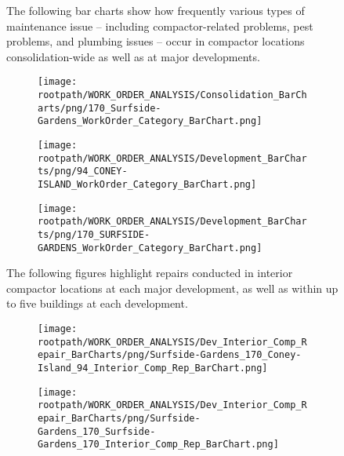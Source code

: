 \begin{figure}[h]
                                \sf
                                The following bar charts show how frequently various types of maintenance issue -- including compactor-related problems, pest problems, and plumbing issues -- occur in compactor locations consolidation-wide as well as at major developments.
                                \raggedright
                                \begin{subfigure}{\textwidth}
                                \texttt{[image: \\rootpath/WORK\_ORDER\_ANALYSIS/Consolidation\_BarCharts/png/170\_Surfside-Gardens\_WorkOrder\_Category\_BarChart.png]}
                                \end{subfigure}
                                \begin{subfigure}{0.45\textwidth}
                                        \texttt{[image: \\rootpath/WORK\_ORDER\_ANALYSIS/Development\_BarCharts/png/94\_CONEY-ISLAND\_WorkOrder\_Category\_BarChart.png]}
                                        \end{subfigure}
                                        \begin{subfigure}{0.45\textwidth}
                                        \texttt{[image: \\rootpath/WORK\_ORDER\_ANALYSIS/Development\_BarCharts/png/170\_SURFSIDE-GARDENS\_WorkOrder\_Category\_BarChart.png]}
                                        \end{subfigure}
                                        \end{figure}
\begin{figure}[h]
                                \raggedright
                                \sf
                                The following figures highlight repairs conducted in interior compactor locations at each major development, as well as within up to five buildings at each development.\\
                                \begin{subfigure}{0.45\textwidth}
                                        \texttt{[image: \\rootpath/WORK\_ORDER\_ANALYSIS/Dev\_Interior\_Comp\_Repair\_BarCharts/png/Surfside-Gardens\_170\_Coney-Island\_94\_Interior\_Comp\_Rep\_BarChart.png]}
                                        \end{subfigure}
                                        \begin{subfigure}{0.45\textwidth}
                                        \texttt{[image: \\rootpath/WORK\_ORDER\_ANALYSIS/Dev\_Interior\_Comp\_Repair\_BarCharts/png/Surfside-Gardens\_170\_Surfside-Gardens\_170\_Interior\_Comp\_Rep\_BarChart.png]}
                                        \end{subfigure}
                                        
\end{figure}
